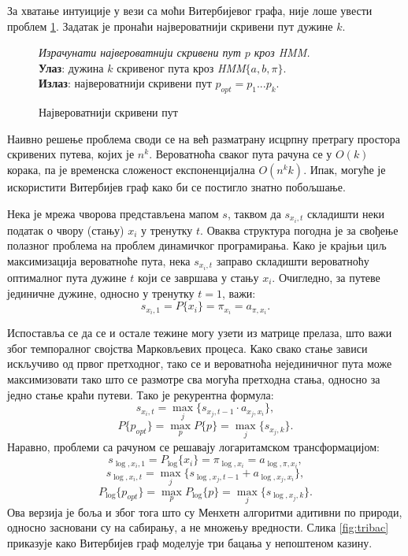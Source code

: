 \documentclass[12pt,oneside]{memoir}
\newenvironment{problem}[1][!ht]
{\renewcommand{\algorithmcfname}{Проблем}
\begin{figure}[!ht]
\centering
  \begin{minipage}{.94\linewidth}
	\begin{algorithm}[#1]%
  }{\end{algorithm}
  \end{minipage}
\end{figure}}
\begin{document}
\begin{CJK}{UTF8}{ipxm}
За хватање интуиције у вези са моћи Витербијевог графа, није лоше увести проблем \ref{prob:maxput}. Задатак је пронаћи највероватнији скривени пут дужине $k$.

\begin{problem}[H]
  \SetAlgoLined
  \textit{Израчунати највероватнији скривени пут $p$ кроз \textit{HMM}.}\\
  \textbf{Улаз}: дужина $k$ скривеног пута кроз \textit{HMM}$\{a, b, \pi\}$.\\
  \textbf{Излаз}: највероватнији скривени пут $p_{opt} = p_1...p_k$.
  \caption{Највероватнији скривени пут}
  \label{prob:maxput}
\end{problem}

Наивно решење проблема своди се на већ разматрану исцрпну претрагу простора скривених путева, којих је $n^k$. Вероватноћа сваког пута рачуна се у $O(k)$ корака, па је временска сложеност експоненцијална $O(n^k k)$. Ипак, могуће је искористити Витербијев граф како би се постигло знатно побољшање.

Нека је мрежа чворова представљена мапом $s$, таквом да $s_{x_i, t}$ складишти неки податак о чвору (стању) $x_i$ у тренутку $t$. Оваква структура погодна је за свођење полазног проблема на проблем динамичког програмирања. Како је крајњи циљ максимизација вероватноће пута, нека $s_{x_i, t}$ заправо складишти вероватноћу оптималног пута дужине $t$ који се завршава у стању $x_i$. Очигледно, за путеве јединичне дужине, односно у тренутку $t=1$, важи: $$s_{x_i, 1} = P\{x_i\} = \pi_{x_i} = a_{\pi, x_i}.$$

Испоставља се да се и остале тежине могу узети из матрице прелаза, што важи због темпоралног својства Марковљевих процеса. Како свако стање зависи искључиво од првог претходног, тако се и вероватноћа нејединичног пута може максимизовати тако што се размотре сва могућа претходна стања, односно за једно стање краћи путеви. Тако је рекурентна формула: $$s_{x_i, t} = \max_j \{s_{x_j, t-1} \cdot a_{x_j, x_i}\},$$ $$P\{p_{opt}\} = \max_p P\{p\} = \max_j \{s_{x_j, k}\}.$$ Наравно, проблеми са рачуном се решавају логаритамском трансформацијом: $$s_{\log, x_i, 1} = P_{\log}\{x_i\} = \pi_{\log, x_i} = a_{\log, \pi, x_i},$$ $$s_{\log, x_i, t} = \max_j \{s_{\log, x_j, t-1} + a_{\log, x_j, x_i}\},$$ $$P_{\log}\{p_{opt}\} = \max_p P_{\log}\{p\} = \max_j \{s_{\log, x_j, k}\}.$$ Ова верзија је боља и због тога што су Менхетн алгоритми адитивни по природи, односно засновани су на сабирању, а не множењу вредности. Слика \ref{fig:tribac} приказује како Витербијев граф моделује три бацања у непоштеном казину.


\end{CJK}
\end{document}
